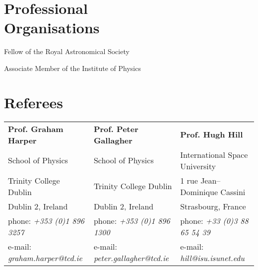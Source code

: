 \documentclass[margin,line]{resume}
\begin{document}
\begin{resume}
    \section{\mysidestyle Professional\\Organisations} 
	\begin{list2}
    \item Fellow of the Royal Astronomical Society
    \item Associate Member of the Institute of Physics \vspace{-1mm}\\%
    \end{list2}
    

\vspace{0mm}
\section{\mysidestyle Referees} 

\begin{tabular}{@{}p{4.6cm}p{4.6cm}p{4.8cm}}
\textbf{Prof. Graham Harper}       &  \textbf{Prof. Peter Gallagher}   &  \textbf{Prof. Hugh Hill} \\
School of Physics                      &  School of Physics                   &  International Space University \\
Trinity College Dublin                 &  Trinity College Dublin                   &  1 rue Jean--Dominique Cassini \\
Dublin 2, Ireland				       &  Dublin 2, Ireland		         &  Strasbourg, France \\
phone: \textsl{+353 (0)1 896 3257}    &  phone: \textsl{+353 (0)1 896 1300} &  phone: \textsl{+33 (0)3 88 65 54 39} \\
e-mail: \textsl{graham.harper@tcd.ie}   &  e-mail: \textsl{peter.gallagher@tcd.ie}&  e-mail: \textsl{hill@isu.isunet.edu} \\
\end{tabular}




\end{resume}
\end{document}
